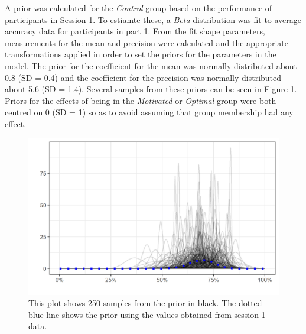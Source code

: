\documentclass[vision,article,submit,moreauthors,pdftex,10pt,a4paper]{mdpi}
\begin{document}
A prior was calculated for the \textit{Control} group based on the performance of participants in Session 1. To estiamte these, a \textit{Beta} distribution was fit to average accuracy data for participants in part 1. From the fit shape parameters, measurements for the mean and precision were calculated and the appropriate transformations applied in order to set the priors for the parameters in the model. The prior for the coefficient for the mean was normally distributed about 0.8 (SD = 0.4) and the coefficient for the precision was normally distributed about 5.6 (SD = 1.4). Several samples from these priors can be seen in Figure \ref{fig:Priors}. Priors for the effects of being in the \textit{Motivated} or \textit{Optimal} group were both centred on 0 (SD = 1) so as to avoid assuming that group membership had any effect. 


\begin{figure}[H]
	\centering
	\includegraphics[width=12cm]{../Figures/priors_plt_estfromdata.png}
	\caption{This plot shows 250 samples from the prior in black. The dotted blue line shows the prior using the values obtained from session 1 data.}
	\label{fig:Priors}
\end{figure} 

\end{document}
